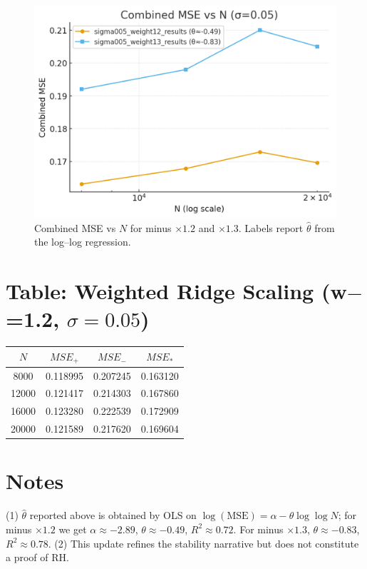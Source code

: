 \documentclass[11pt]{article}
\theoremstyle{remark}
\begin{document}
\begin{figure}[h]
\centering
\includegraphics[width=.82\linewidth]{figures/combined_weighted_compare.png}
\caption{Combined MSE vs $N$ for minus $\times 1.2$ and $\times 1.3$. Labels report $\hat\theta$ from the log--log regression.}
\end{figure}

\section*{Table: Weighted Ridge Scaling (w$-{}$=1.2, $\sigma=0.05$)}
\begin{center}
\begin{tabular}{c|ccc}
\hline
$N$ & $MSE_+$ & $MSE_-$ & $MSE_\ast$ \\ \hline
8000  & 0.118995 & 0.207245 & 0.163120 \\
12000 & 0.121417 & 0.214303 & 0.167860 \\
16000 & 0.123280 & 0.222539 & 0.172909 \\
20000 & 0.121589 & 0.217620 & 0.169604 \\ \hline
\end{tabular}
\end{center}

\section*{Notes}
(1) $\hat\theta$ reported above is obtained by OLS on $\log(\mathrm{MSE})=\alpha-\theta\log\log N$; 
for minus $\times 1.2$ we get $\alpha\approx -2.89$, $\theta\approx -0.49$, $R^2\approx 0.72$.
For minus $\times 1.3$, $\theta\approx -0.83$, $R^2\approx 0.78$. 
(2) This update refines the stability narrative but does not constitute a proof of RH.
\end{document}
